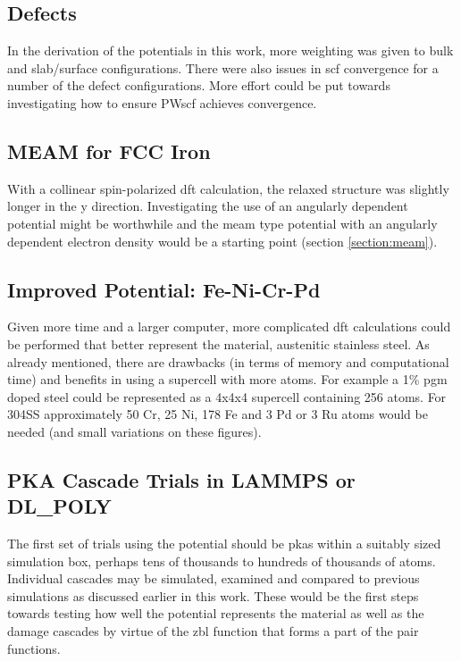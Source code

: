 \subsection{Defects}

In the derivation of the potentials in this work, more weighting was given to bulk and slab/surface configurations.  There were also issues in \acrshort{scf} convergence for a number of the defect configurations.  More effort could be put towards investigating how to ensure PWscf achieves convergence. 


\subsection{MEAM for FCC Iron}
\label{section:futuremeam}

With a collinear spin-polarized \acrshort{dft} calculation, the relaxed structure was slightly longer in the y direction.  Investigating the use of an angularly dependent potential might be worthwhile and the \acrshort{meam} type potential with an angularly dependent electron density would be a starting point (section \ref{section:meam}). 
 

\subsection{Improved Potential: Fe-Ni-Cr-Pd}

Given more time and a larger computer, more complicated \acrshort{dft} calculations could be performed that better represent the material, austenitic stainless steel.  As already mentioned, there are drawbacks (in terms of memory and computational time) and benefits in using a supercell with more atoms.  For example a 1\% \acrshort{pgm} doped steel could be represented as a 4x4x4 supercell containing 256 atoms.  For \gls{304SS} approximately 50 Cr, 25 Ni, 178 Fe and 3 Pd or 3 Ru atoms would be needed (and small variations on these figures).

\subsection{PKA Cascade Trials in LAMMPS or DL\_POLY}

The first set of trials using the potential should be \acrshort{pka}s within a suitably sized simulation box, perhaps tens of thousands to hundreds of thousands of atoms.  Individual cascades may be simulated, examined and compared to previous simulations as discussed earlier in this work.  These would be the first steps towards testing how well the potential represents the material as well as the damage cascades by virtue of the \acrshort{zbl} function that forms a part of the pair functions.
 

